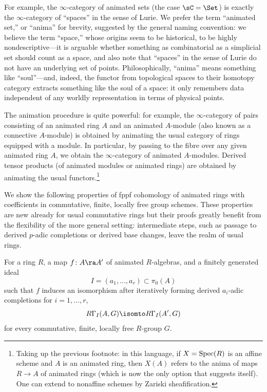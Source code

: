 For example, the $\infty$-category of animated sets (the case $\sC = \Set$) is exactly the $\infty$-category of ``spaces'' in the sense of Lurie. We prefer the term ``animated set,'' or ``anima'' for brevity, suggested by the general naming convention: we believe the term ``space,''  whose origins seem to be historical, to be highly nondescriptive---it is arguable whether something as combinatorial as a simplicial set should count as a space, and also note that ``spaces'' in the sense of Lurie do not have an underlying set of points. %
Philosophically, ``anima''  means something like ``soul''---and, indeed, the functor from topological spaces to their homotopy category extracts something like the soul of a space: it only remembers data independent of any worldly representation in terms of physical points.%

The animation procedure is quite powerful: for example, the $\infty$-category of pairs consisting of an animated ring $A$ and an animated $A$-module (also known as a connective $A$-module) is obtained by animating the usual category of rings equipped with a module. In particular, by passing to the fibre over any given animated ring $A$, we obtain the $\infty$-category of animated $A$-modules. Derived tensor products (of animated modules or animated rings) are obtained by animating the usual functors.\footnote{Taking up the previous footnote: in this language, if $X=\operatorname{Spec}(R)$ is an affine scheme and $A$ is an animated ring, then $X(A)$ refers to the anima of maps $R\to A$ of animated rings (which is now the only option that suggests itself). One can extend to nonaffine schemes by Zariski sheafification.}

We show the following properties of fppf cohomology of animated rings with coefficients in commutative, finite, locally free group schemes. These properties are new already for usual commutative rings but their proofs greatly benefit from the flexibility of the more general setting: intermediate steps, such as passage to derived $p$-adic completions or derived base changes, leave the realm of usual rings. %

 \label{thm:excision-ann}
For a ring $R$, a map $f\colon A \ra A'$ of animated $R$-algebras, and a finitely generated ideal
\[
I = (a_1, \dotsc, a_r) \subset \pi_0(A)
\] %
such that $f$ induces an isomorphism after iteratively forming derived $a_i$-adic completions for $i = 1, \dotsc, r$, %
\[
R\Gamma_I(A, G) \isomto R\Gamma_I(A', G)
\]
for every commutative, finite, locally free $R$-group $G$.
\ethm

